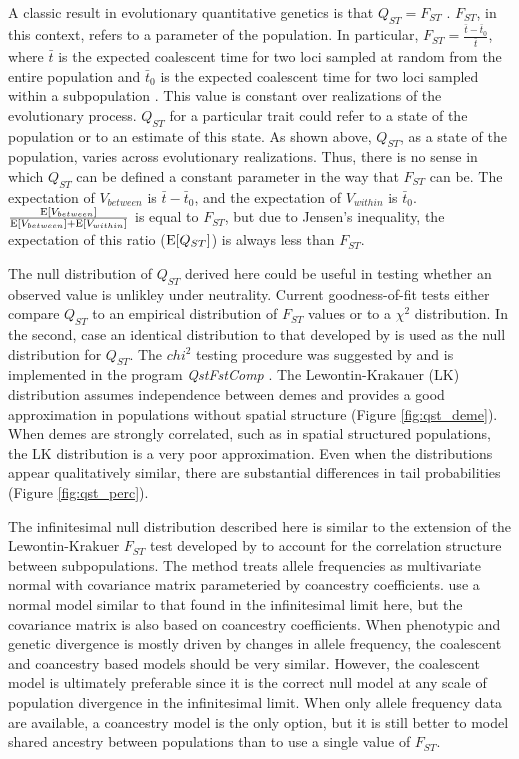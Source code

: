 A classic result in evolutionary quantitative genetics is that $Q_{ST}=F_{ST}$
\citep{Whitlock1999}. $F_{ST}$, in this context, refers to a parameter of the
population. In particular, $F_{ST} = \frac{\bar{t} - \bar{t}_0}{\bar{t}}$, where
$\bar{t}$ is the expected coalescent time for two loci sampled at random from
the entire population and $\bar{t}_0$ is the expected coalescent time for two
loci sampled within a subpopulation \citep{Slatkin1991}. This value is constant
over realizations of the evolutionary process. $Q_{ST}$ for a particular trait
could refer to a state of the population or to an estimate of this state. As
shown above, $Q_{ST}$, as a state of the population, varies across evolutionary
realizations. Thus, there is no sense in which $Q_{ST}$ can be defined a
constant parameter in the way that $F_{ST}$ can be. The expectation of
$V_{between}$ is $\bar{t} - \bar{t}_0$, and the expectation of $V_{within}$ is
$\bar{t}_0$. $\frac{\mathrm{E}[V_{between}]}{\mathrm{E}[V_{between}] + \mathrm{E}[V_{within}]}$ is equal
to $F_{ST}$, but due to Jensen's inequality, the expectation of this ratio
($\mathrm{E}[Q_{ST}]$) is always less than $F_{ST}$.

The null distribution of $Q_{ST}$ derived here could be useful in testing
whether an observed value is unlikley under neutrality. Current goodness-of-fit
tests either compare $Q_{ST}$ to an empirical distribution of $F_{ST}$ values or
to a $\chi^2$ distribution. In the second, case an identical distribution to
that developed by \citet{Lewontin1973} is used as the null distribution for
$Q_{ST}$. The $chi^2$ testing procedure was suggested by \citet{Whitlock2009}
and is implemented in the program \textit{QstFstComp} \citep{Gilbert2015}. The
Lewontin-Krakauer (LK) distribution assumes independence between demes and
provides a good approximation in populations without spatial structure (Figure
\ref{fig:qst_deme}). When demes are strongly correlated, such as in spatial
structured populations, the LK distribution is a very poor approximation. Even
when the distributions appear qualitatively similar, there are substantial
differences in tail probabilities (Figure \ref{fig:qst_perc}).

The infinitesimal null distribution described here is similar to the extension
of the Lewontin-Krakuer $F_{ST}$ test developed by \citet{Bonhomme2010} to
account for the correlation structure between subpopulations. The
\citet{Bonhomme2010} method treats allele frequencies as multivariate normal
with covariance matrix parameteried by coancestry coefficients.
\citet{Ovaskainen2011} use a normal model similar to that found in the
infinitesimal limit here, but the covariance matrix is also based on coancestry
coefficients. When phenotypic and genetic divergence is mostly driven by changes
in allele frequency, the coalescent and coancestry based models should be very
similar. However, the coalescent model is ultimately preferable since it is the
correct null model at any scale of population divergence in the infinitesimal
limit. When only allele frequency data are available, a coancestry model is the
only option, but it is still better to model shared ancestry between populations
than to use a single value of $F_{ST}$.
